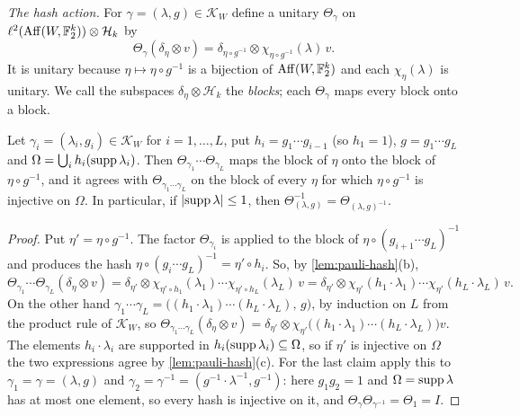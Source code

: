\emph{The hash action.} For $\gamma=(\lambda,g)\in\mathcal K_W$ define a unitary $\Theta_\gamma$ on
$\ell^2(\operatorname{Aff}(W,\mathbb F_2^k))\otimes\mathcal H_k$ by
\[
\Theta_\gamma(\delta_\eta\otimes v)=\delta_{\eta\circ g^{-1}}\otimes\chi_{\eta\circ g^{-1}}(\lambda)\,v .
\]
It is unitary because $\eta\mapsto\eta\circ g^{-1}$ is a bijection of $\operatorname{Aff}(W,\mathbb F_2^k)$ and each $\chi_\eta(\lambda)$ is
unitary. We call the subspaces $\delta_\eta\otimes\mathcal H_k$ the \emph{blocks}; each $\Theta_\gamma$ maps every block onto a block.

\begin{lemma}[Products]\label{lem:hash-product}
Let $\gamma_i=(\lambda_i,g_i)\in\mathcal K_W$ for $i=1,\dots,L$, put $h_i=g_1\cdots g_{i-1}$ (so $h_1=1$), $g=g_1\cdots g_L$ and
$\Omega=\bigcup_ih_i(\operatorname{supp}\lambda_i)$. Then $\Theta_{\gamma_1}\cdots\Theta_{\gamma_L}$ maps the block of $\eta$ onto the block of
$\eta\circ g^{-1}$, and it agrees with $\Theta_{\gamma_1\cdots\gamma_L}$ on the block of every $\eta$ for which $\eta\circ g^{-1}$ is
injective on $\Omega$. In particular, if $\lvert\operatorname{supp}\lambda\rvert\le1$, then $\Theta_{(\lambda,g)}^{-1}=\Theta_{(\lambda,g)^{-1}}$.
\end{lemma}

\begin{proof}
Put $\eta'=\eta\circ g^{-1}$. The factor $\Theta_{\gamma_i}$ is applied to the block of $\eta\circ(g_{i+1}\cdots g_L)^{-1}$ and produces the
hash $\eta\circ(g_i\cdots g_L)^{-1}=\eta'\circ h_i$. So, by \cref{lem:pauli-hash}(b),
\[
\Theta_{\gamma_1}\cdots\Theta_{\gamma_L}(\delta_\eta\otimes v)=\delta_{\eta'}\otimes\chi_{\eta'\circ h_1}(\lambda_1)\cdots\chi_{\eta'\circ h_L}(\lambda_L)\,v
=\delta_{\eta'}\otimes\chi_{\eta'}(h_1\cdot\lambda_1)\cdots\chi_{\eta'}(h_L\cdot\lambda_L)\,v .
\]
On the other hand $\gamma_1\cdots\gamma_L=\bigl((h_1\cdot\lambda_1)\cdots(h_L\cdot\lambda_L),\,g\bigr)$, by induction on $L$ from the product
rule of $\mathcal K_W$, so $\Theta_{\gamma_1\cdots\gamma_L}(\delta_\eta\otimes v)=\delta_{\eta'}\otimes
\chi_{\eta'}\bigl((h_1\cdot\lambda_1)\cdots(h_L\cdot\lambda_L)\bigr)v$. The elements $h_i\cdot\lambda_i$ are supported in
$h_i(\operatorname{supp}\lambda_i)\subseteq\Omega$, so if $\eta'$ is injective on $\Omega$ the two expressions agree by \cref{lem:pauli-hash}(c). For the
last claim apply this to $\gamma_1=\gamma=(\lambda,g)$ and $\gamma_2=\gamma^{-1}=(g^{-1}\cdot\lambda^{-1},g^{-1})$: here $g_1g_2=1$ and
$\Omega=\operatorname{supp}\lambda$ has at most one element, so every hash is injective on it, and $\Theta_\gamma\Theta_{\gamma^{-1}}=\Theta_1=I$.
\end{proof}

